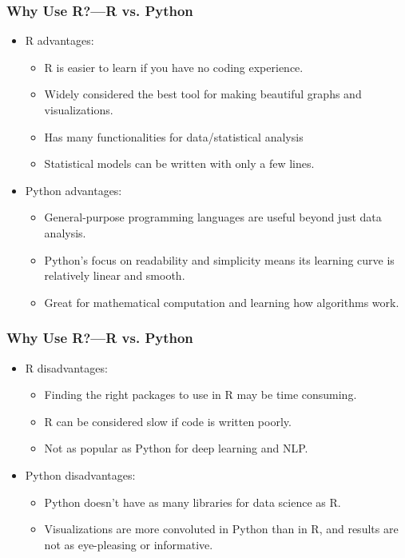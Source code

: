 \documentclass[aspectratio=169, 12pt]{beamer}
\begin{document}
	\begin{frame}
	\frametitle{Why Use R?---R vs. Python}
	\begin{itemize}
	\item R advantages:
	\begin{itemize}
	\item R is easier to learn if you have no coding experience.
	\item Widely considered the best tool for making beautiful graphs and visualizations.
	\item Has many functionalities for data/statistical analysis
	\item Statistical models can be written with only a few lines.
	\end{itemize}
	\item Python advantages:
	\begin{itemize}
	\item General-purpose programming languages are useful beyond just data analysis.
	\item Python’s focus on readability and simplicity means its learning curve is relatively linear and smooth.
	\item Great for mathematical computation and learning how algorithms work.
	\end{itemize}
	\end{itemize}

	\end{frame}

	\begin{frame}
	\frametitle{Why Use R?---R vs. Python}
	\begin{itemize}
	\item R disadvantages:
	\begin{itemize}
	\item Finding the right packages to use in R may be time consuming.
	\item R can be considered slow if code is written poorly.
	\item Not as popular as Python for deep learning and NLP.
	\end{itemize}
	\item Python disadvantages:
	\begin{itemize}
	\item Python doesn’t have as many libraries for data science as R.
	\item Visualizations are more convoluted in Python than in R, and results are not as eye-pleasing or informative.
	\end{itemize}
	\end{itemize}

	\end{frame}
\end{document}
